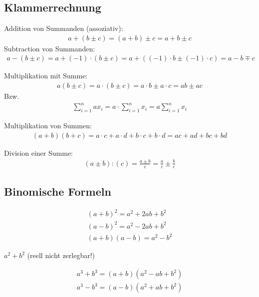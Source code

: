 \pagebreak
\subsection{Klammerrechnung}

Addition von Summanden (assoziativ):
\begin{align*}
 a + (b \pm c) = (a + b) \pm c = a + b \pm c 
\end{align*}
Subtraction von Summanden:
\begin{align*}
 a - (b \pm c) = a + (-1) \cdot  (b \pm c) = a + (  (-1) \cdot  b \pm  (-1) \cdot c)  =  a - b \mp c
\end{align*}


Multiplikation mit Summe:
\begin{align*}
 a (b \pm c) =  a \cdot (b \pm c) = a \cdot b \pm a \cdot c = ab \pm ac
\end{align*}
Bzw.
\begin{align*} 
 \sum_{i=1}^n ax_{i}  = a \cdot  \sum_{i=1}^n x_{i} = a  \sum_{i=1}^n x_{i}
 \end{align*}


Multiplikation von Summen:
\begin{align*}
 (a+b)(b+c) = a \cdot c +a \cdot d +b \cdot c +b \cdot d = ac +ad +bc +bd 
\end{align*}

Division einer Summe:
\begin{align*}
 (a \pm b):(c) = \frac{a \pm b}{c} = \frac{a}{c} \pm  \frac{b}{c} 
\end{align*}

\subsection{Binomische Formeln}
\begin{align*}
(a+b)^ 2 = a^ 2 + 2ab + b^2\\
(a-b)^ 2 =  a^ 2 - 2ab + b^2 \\
(a+b)(a-b) = a^ 2 - b^2
\end{align*}

$a^ 2 + b^2 $ (reell nicht zerlegbar!)


\begin{align*}
a^ 3 + b^3 = (a+b)( a^ 2 - ab + b^2) \\
a^ 3 - b^3 = (a-b)( a^ 2 + ab + b^2)
\end{align*}


 




